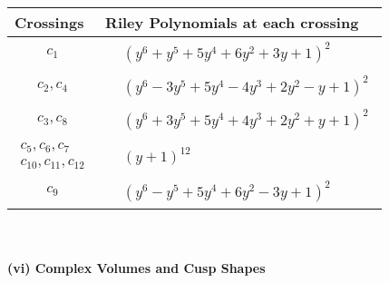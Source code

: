 \documentclass[1p]{elsarticle_modified}
\theoremstyle{definition}
\begin{document}
\begin{tabular}{m{50pt}|m{274pt}}
Crossings & \hspace{64pt}Riley Polynomials at each crossing \\
\hline $$\begin{aligned}c_{1}\end{aligned}$$&$\begin{aligned}
&(y^6+y^5+5 y^4+6 y^2+3 y+1)^2
\end{aligned}$\\
\hline $$\begin{aligned}c_{2},c_{4}\end{aligned}$$&$\begin{aligned}
&(y^6-3 y^5+5 y^4-4 y^3+2 y^2- y+1)^2
\end{aligned}$\\
\hline $$\begin{aligned}c_{3},c_{8}\end{aligned}$$&$\begin{aligned}
&(y^6+3 y^5+5 y^4+4 y^3+2 y^2+y+1)^2
\end{aligned}$\\
\hline $$\begin{aligned}c_{5},c_{6},c_{7}\\c_{10},c_{11},c_{12}\end{aligned}$$&$\begin{aligned}
&(y+1)^{12}
\end{aligned}$\\
\hline $$\begin{aligned}c_{9}\end{aligned}$$&$\begin{aligned}
&(y^6- y^5+5 y^4+6 y^2-3 y+1)^2
\end{aligned}$\\
\hline
\end{tabular}\\~\\
\newpage\flushleft \textbf{(vi) Complex Volumes and Cusp Shapes}
\end{document}
